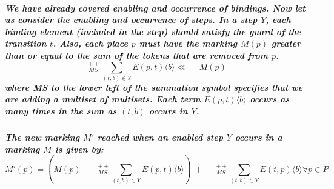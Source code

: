 \subparagraph*{\textnormal{We have already covered enabling and occurrence of bindings. Now let us consider the enabling and occurrence of steps. In a step $\mathit{Y}$, each binding element (included in the step) should satisfy the guard of the transition $t$. Also, each place $\mathit{p}$ must have the marking $\mathit{M(p)}$ greater than or equal to the sum of the tokens that are removed from $\mathit{p}$.
		\begin{equation*}
		^{++}_{MS} \sum\limits_{(t,b) \in Y} E(p,t)\langle b \rangle \ll= M(p)
		\end{equation*}
		where MS to the lower left of the summation symbol specifies that
		we are adding a multiset of multisets. Each term $E(p, t)\langle b \rangle$ occurs as many times in the sum as $(t,b)$ occurs in $Y$.}}

\subparagraph*{\textnormal{The new marking $\mathit{M'}$ reached when an enabled step $\mathit{Y}$ occurs in a
		marking $\mathit{M}$ is given by:
		\begin{equation*}
			M'(p) = \left(M(p) -\!- ^{++}_{MS} \sum\limits_{(t,b) \in Y} E(p,t)\langle b \rangle \right)\ +\!\!+\ ^{++}_{MS}\sum\limits_{(t,b) \in Y} E(t,p)\langle b \rangle \forall p \in P
\end{equation*}}}

